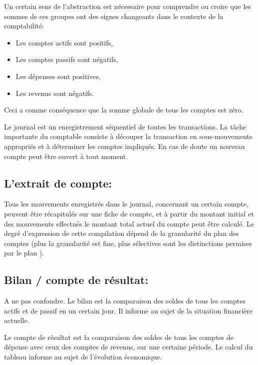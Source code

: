 \documentclass[12pt]{report}
\begin{document}
Un certain sens de l'abstraction est nécessaire pour comprendre ou croire que
les sommes de ces groupes ont des signes changeants dans le contexte de la
comptabilité:

\begin{itemize}
\item Les comptes actifs sont positifs, 

\item Les comptes passifs sont négatifs,

\item Les dépenses sont positives,

\item Les revenus sont négatifs.

\end{itemize}

Ceci a comme conséquence que la somme globale de tous les comptes est zéro.

Le journal est un enregistrement séquentiel de toutes les transactions.  La
tâche importante du comptable consiste à découper la transaction en
sous-mouvements appropriés et à déterminer les comptes impliqués. En cas de
doute un nouveau compte peut être ouvert à tout moment.



\subsection{L'extrait de compte:} 

Tous les mouvements enregistrés dans le journal, concernant un certain compte,
peuvent être récapitulés sur une fiche de compte, et à partir du montant
initial et des mouvements effectués le montant total actuel du compte peut être
calculé.  Le degré d'expression de cette compilation dépend de la granularité
du plan des comptes (plus la granularité est fine, plus sélectives sont les
distinctions permises par le plan ).

\subsection{Bilan / compte de résultat:} 

A ne pas confondre.  Le bilan est la comparaison des soldes de tous les
 comptes actifs et de passif en un certain jour.  Il informe au sujet de la
 situation financière actuelle.

Le compte de résultat est la comparaison des soldes de tous les comptes de
dépense avec ceux des comptes de revenus, sur une certaine période.  Le calcul
du tableau informe au sujet de l'évolution économique.
\end{document}

